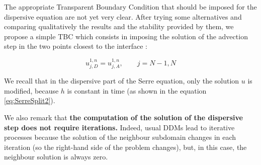 \indent The appropriate Transparent Boundary Condition that should be imposed for the dispersive equation are not yet very clear. After trying some alternatives and comparing qualitatively the results and the stability provided by them, we propose a simple TBC which consists in imposing the solution of the advection step in the two points closest to the interface : 

\begin{equation}
	\label{eq:TBCSerre}
	u^{1,n}_{j,D} = u^{1,n}_{j,A}, \qquad j=N-1,N 
\end{equation}

\indent We recall that in the dispersive part of the Serre equation, only the solution $u$ is modified, because $h$ is constant in time (as shown in the equation \ref{eq:SerreSplit2}).

\indent We also remark that \textbf{the computation of the solution of the dispersive step does not require iterations.} Indeed, usual DDMs lead to iterative processes because the solution of the neighbour subdomain changes in each iteration (so the right-hand side of the problem changes), but, in this case, the neighbour solution is always zero.